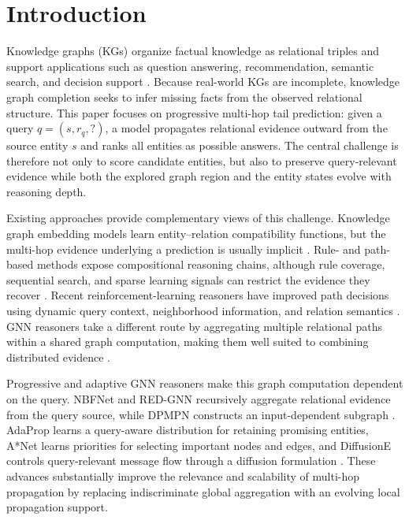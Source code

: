 \documentclass[a4paper,fleqn]{cas-sc}
\begin{document}
\maketitle

\section{Introduction}\label{sec:introduction}

Knowledge graphs (KGs) organize factual knowledge as relational triples and
support applications such as question answering, recommendation, semantic
search, and decision support \citep{ji2021survey}. Because real-world KGs are
incomplete, knowledge graph completion seeks to infer missing facts from the
observed relational structure. This paper focuses on progressive multi-hop tail
prediction: given a query $q=(s,r_q,?)$, a model propagates relational evidence
outward from the source entity $s$ and ranks all entities as possible answers.
The central challenge is therefore not only to score candidate entities, but
also to preserve query-relevant evidence while both the explored graph region
and the entity states evolve with reasoning depth.

Existing approaches provide complementary views of this challenge. Knowledge
graph embedding models learn entity--relation compatibility functions, but the
multi-hop evidence underlying a prediction is usually implicit
\citep{bordes2013transe,trouillon2016complex,sun2019rotate}. Rule- and path-based
methods expose compositional reasoning chains, although rule coverage,
sequential search, and sparse learning signals can restrict the evidence they
recover \citep{xiong2017deeppath,das2018minerva,yang2017neurallp,
sadeghian2019drum,qu2020rnnlogic}. Recent reinforcement-learning reasoners have
improved path decisions using dynamic query context, neighborhood information,
and relation semantics \citep{shang2024attention,wang2025losa}. GNN reasoners
take a different route by aggregating multiple relational paths within a shared
graph computation, making them well suited to combining distributed evidence
\citep{schlichtkrull2018modeling,vashishth2019composition}.

Progressive and adaptive GNN reasoners make this graph computation dependent on
the query. NBFNet and RED-GNN recursively aggregate relational evidence from the
query source, while DPMPN constructs an input-dependent subgraph
\citep{zhu2021neural,zhang2022knowledge,xu2019dpmpn}. AdaProp learns a
query-aware distribution for retaining promising entities, A*Net learns
priorities for selecting important nodes and edges, and DiffusionE controls
query-relevant message flow through a diffusion formulation
\citep{zhang2022adaprop,zhu2023astarnet,cao2024diffusione}. These advances
substantially improve the relevance and scalability of multi-hop propagation by
replacing indiscriminate global aggregation with an evolving local propagation
support.
\end{document}
